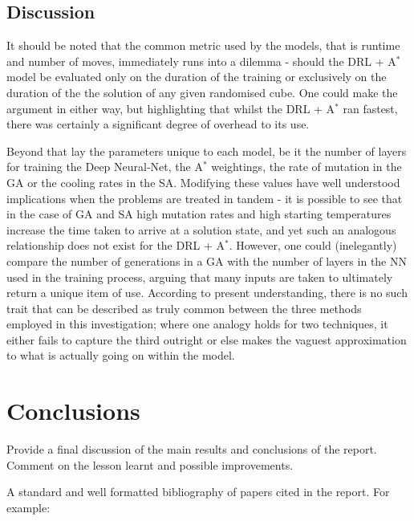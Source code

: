 \documentclass[UKenglish]{libraries/svproc}
\begin{document}
\subsection{Discussion}
It should be noted that the common metric used by the models, that is runtime and number of moves, immediately runs into a dilemma - should the DRL + A$^{\ast}$ model be evaluated only on the duration of the training or exclusively on the duration of the the solution of any given randomised cube. One could make the argument in either way, but highlighting that whilst the DRL + A$^{\ast}$ ran fastest, there was certainly a significant degree of overhead to its use. \par Beyond that lay the parameters unique to each model, be it the number of layers for training the Deep Neural-Net, the A$^{\ast}$ weightings, the rate of mutation in the GA or the cooling rates in the SA. Modifying these values have well understood implications when the problems are treated in tandem - it is possible to see that in the case of GA and SA high mutation rates and high starting temperatures increase the time taken to arrive at a solution state, and yet such an analogous relationship does not exist for the DRL + A$^{\ast}$. However, one could (inelegantly) compare the number of generations in a GA with the number of layers in the NN used in the training process, arguing that many inputs are taken to ultimately return a unique item of use. According to present understanding, there is no such trait that can be described as truly common between the three methods employed in this investigation; where one analogy holds for two techniques, it either fails to capture the third outright or else makes the vaguest approximation to what is actually going on within the model. 

\section{Conclusions}
Provide a final discussion of the main results and conclusions of the report. Comment on the lesson learnt and possible improvements.


A standard and well formatted bibliography of papers cited in the report. For example:

\printbibliography
\end{document}
